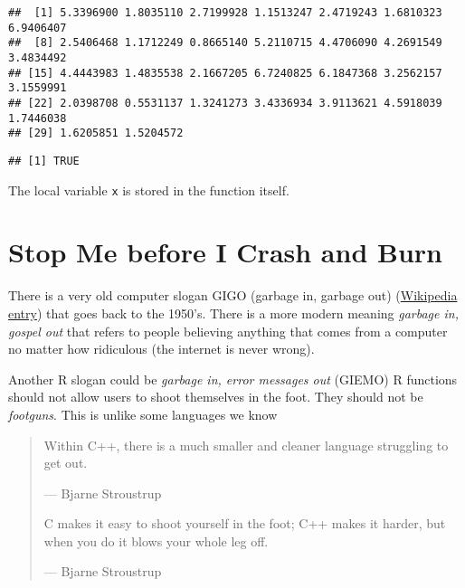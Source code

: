 \documentclass[
]{article}
\newenvironment{Shaded}{\begin{snugshade}}{\end{snugshade}}
\newcommand{\FunctionTok}[1]{\textcolor[rgb]{0.00,0.00,0.00}{#1}}
\newcommand{\NormalTok}[1]{#1}
\newcommand{\SpecialCharTok}[1]{\textcolor[rgb]{0.00,0.00,0.00}{#1}}
\begin{document}
\begin{verbatim}
##  [1] 5.3396900 1.8035110 2.7199928 1.1513247 2.4719243 1.6810323 6.9406407
##  [8] 2.5406468 1.1712249 0.8665140 5.2110715 4.4706090 4.2691549 3.4834492
## [15] 4.4443983 1.4835538 2.1667205 6.7240825 6.1847368 3.2562157 3.1559991
## [22] 2.0398708 0.5531137 1.3241273 3.4336934 3.9113621 4.5918039 1.7446038
## [29] 1.6205851 1.5204572
\end{verbatim}

\begin{Shaded}
\end{Shaded}

\begin{verbatim}
## [1] TRUE
\end{verbatim}

The local variable \texttt{x} is stored in the function itself.

\hypertarget{stop-me-before-i-crash-and-burn}{%
\section{Stop Me before I Crash and
Burn}\label{stop-me-before-i-crash-and-burn}}

There is a very old computer slogan GIGO (garbage in, garbage out)
(\href{https://en.wikipedia.org/w/index.php?title=Garbage_in,_garbage_out\&oldid=740536906}{Wikipedia
entry}) that goes back to the 1950's. There is a more modern meaning
\emph{garbage in, gospel out} that refers to people believing anything
that comes from a computer no matter how ridiculous (the internet is
never wrong).

Another R slogan could be \emph{garbage in, error messages out} (GIEMO)
R functions should not allow users to shoot themselves in the foot. They
should not be \emph{footguns}. This is unlike some languages we know

\begin{quote}
Within C++, there is a much smaller and cleaner language struggling to
get out.

--- Bjarne Stroustrup

C makes it easy to shoot yourself in the foot; C++ makes it harder, but
when you do it blows your whole leg off.

--- Bjarne Stroustrup
\end{quote}
\end{document}
